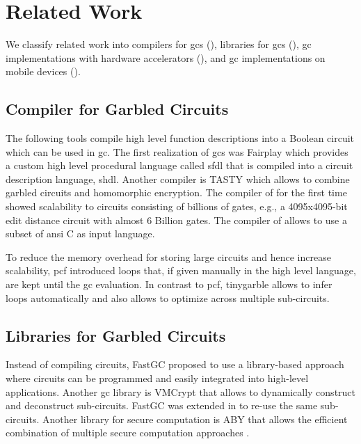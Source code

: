 \chapter{Related Work}
We classify related work into compilers for \acrshort{gc}s (), libraries for \acrshort{gc}s (), \acrshort{gc} implementations with hardware accelerators (), and \acrshort{gc} implementations on mobile devices ().

\section{Compiler for Garbled Circuits}
The following tools compile high level function descriptions into a Boolean circuit which can be used in \acrshort{gc}.
The first realization of \acrshort{gc}s was Fairplay \cite{malkhi2004fairplay} which provides a custom high level procedural language called \acrfull{sfdl} that is compiled into a circuit description language, \acrfull{shdl}.
Another compiler is TASTY \cite{henecka2010tasty} which allows to combine garbled circuits and homomorphic encryption.
The compiler of \cite{kreuter2012billion} for the first time showed scalability to circuits consisting of billions of gates, e.g., a 4095x4095-bit edit distance circuit with almost 6 Billion gates.
The compiler of \cite{franz2014cbmc} allows to use a subset of \acrshort{ansi} C as input language.

To reduce the memory overhead for storing large circuits and hence increase scalability, \gls{pcf} \cite{kreuter2013pcf} introduced loops that, if given manually in the high level language, are kept until the \acrshort{gc} evaluation.
In contrast to \gls{pcf}, \gls{tinygarble} allows to infer loops automatically and also allows to optimize across multiple sub-circuits.

\section{Libraries for Garbled Circuits}
Instead of compiling circuits, FastGC \cite{huang2011faster} proposed to use a library-based approach where circuits can be programmed and easily integrated into high-level applications.
Another \acrshort{gc} library is VMCrypt \cite{malka2011vmcrypt} that allows to dynamically construct and deconstruct sub-circuits.
FastGC was extended in \cite{henecka2013faster} to re-use the same sub-circuits.
Another library for secure computation is ABY that allows the efficient combination of multiple secure computation approaches \cite{demmler2015aby}.

